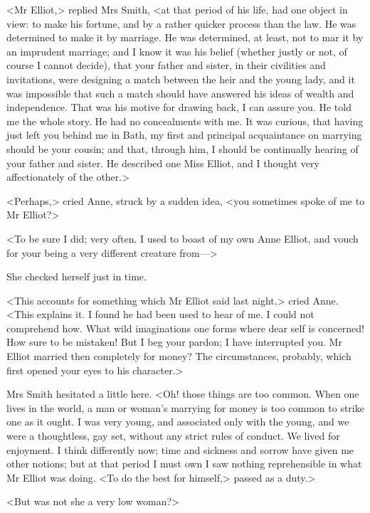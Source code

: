<Mr Elliot,> replied Mrs Smith, <at that period of his life, had one object in view: to make his fortune, and by a rather quicker process than the law. He was determined to make it by marriage. He was determined, at least, not to mar it by an imprudent marriage; and I know it was his belief (whether justly or not, of course I cannot decide), that your father and sister, in their civilities and invitations, were designing a match between the heir and the young lady, and it was impossible that such a match should have answered his ideas of wealth and independence. That was his motive for drawing back, I can assure you. He told me the whole story. He had no concealments with me. It was curious, that having just left you behind me in Bath, my first and principal acquaintance on marrying should be your cousin; and that, through him, I should be continually hearing of your father and sister. He described one Miss Elliot, and I thought very affectionately of the other.>

<Perhaps,> cried Anne, struck by a sudden idea, <you sometimes spoke of me to Mr Elliot?>

<To be sure I did; very often. I used to boast of my own Anne Elliot, and vouch for your being a very different creature from—>

She checked herself just in time.

<This accounts for something which Mr Elliot said last night,> cried Anne. <This explains it. I found he had been used to hear of me. I could not comprehend how. What wild imaginations one forms where dear self is concerned! How sure to be mistaken! But I beg your pardon; I have interrupted you. Mr Elliot married then completely for money? The circumstances, probably, which first opened your eyes to his character.>

Mrs Smith hesitated a little here. <Oh! those things are too common. When one lives in the world, a man or woman's marrying for money is too common to strike one as it ought. I was very young, and associated only with the young, and we were a thoughtless, gay set, without any strict rules of conduct. We lived for enjoyment. I think differently now; time and sickness and sorrow have given me other notions; but at that period I must own I saw nothing reprehensible in what Mr Elliot was doing. <To do the best for himself,> passed as a duty.>

<But was not she a very low woman?>

